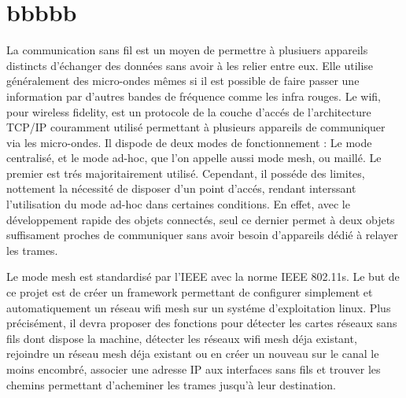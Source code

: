 \chapter*{bbbbb}

La communication sans fil est un moyen de permettre à plusiuers appareils distincts d'échanger des données sans avoir à les relier
entre eux. Elle utilise généralement des micro-ondes mêmes si il est possible de faire passer une information par d'autres bandes de
fréquence comme les infra rouges. Le wifi, pour wireless fidelity, est un protocole de la couche d'accés de l'architecture TCP/IP
couramment utilisé permettant à plusieurs appareils de communiquer via les micro-ondes. Il dispode de deux modes de fonctionnement : 
Le mode centralisé, et le mode ad-hoc, que l'on appelle aussi mode mesh, ou maillé. Le premier est trés majoritairement utilisé. 
Cependant, il posséde des limites, nottement la nécessité de disposer d'un point d'accés, rendant interssant l'utilisation du mode
ad-hoc dans certaines conditions. En effet, avec le développement rapide des objets connectés, seul ce dernier permet à deux objets
suffisament proches de communiquer sans avoir besoin d'appareils dédié à relayer les trames.

Le mode mesh est standardisé par l'IEEE avec la norme IEEE 802.11s. Le but de ce projet est de créer un framework permettant de
configurer simplement et automatiquement un réseau wifi mesh sur un systéme d'exploitation linux. Plus précisément, il devra proposer
des fonctions pour détecter les cartes réseaux sans fils dont dispose la machine, détecter les réseaux wifi mesh déja existant,
rejoindre un réseau mesh déja existant ou en créer un nouveau sur le canal le moins encombré, associer une adresse IP aux interfaces
sans fils et trouver les chemins permettant d'acheminer les trames jusqu'à leur destination.



